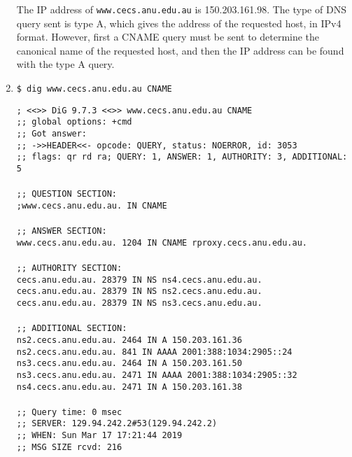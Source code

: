 \documentclass[a4paper,11pt]{article}
\newcommand{\code}{\texttt}
\begin{document}
\begin{enumerate}[leftmargin=*]
	The IP address of \code{www.cecs.anu.edu.au} is 150.203.161.98. The type of DNS query sent is type A, which gives the address of the requested host, in IPv4 format. However, first a CNAME query must be sent to determine the canonical name of the requested host, and then the IP address can be found with the type A query.

	\item \code{\$ dig www.cecs.anu.edu.au CNAME} 

	\code{; <<>> DiG 9.7.3 <<>> www.cecs.anu.edu.au CNAME\\
	;; global options: +cmd\\
	;; Got answer:\\
	;; ->>HEADER<<- opcode: QUERY, status: NOERROR, id: 3053\\
	;; flags: qr rd ra; QUERY: 1, ANSWER: 1, AUTHORITY: 3, ADDITIONAL: 5\\
	\\
	;; QUESTION SECTION:\\
	;www.cecs.anu.edu.au.		IN	CNAME\\
	\\
	;; ANSWER SECTION:\\
	www.cecs.anu.edu.au.	1204	IN	CNAME	rproxy.cecs.anu.edu.au.\\
	\\
	;; AUTHORITY SECTION:\\
	cecs.anu.edu.au.	28379	IN	NS	ns4.cecs.anu.edu.au.\\
	cecs.anu.edu.au.	28379	IN	NS	ns2.cecs.anu.edu.au.\\
	cecs.anu.edu.au.	28379	IN	NS	ns3.cecs.anu.edu.au.\\
	\\
	;; ADDITIONAL SECTION:\\
	ns2.cecs.anu.edu.au.	2464	IN	A	150.203.161.36\\
	ns2.cecs.anu.edu.au.	841	IN	AAAA	2001:388:1034:2905::24\\
	ns3.cecs.anu.edu.au.	2464	IN	A	150.203.161.50\\
	ns3.cecs.anu.edu.au.	2471	IN	AAAA	2001:388:1034:2905::32\\
	ns4.cecs.anu.edu.au.	2471	IN	A	150.203.161.38\\
	\\
	;; Query time: 0 msec\\
	;; SERVER: 129.94.242.2\#53(129.94.242.2)\\
	;; WHEN: Sun Mar 17 17:21:44 2019\\
	;; MSG SIZE  rcvd: 216\\}
		

\end{enumerate}
\end{document}
